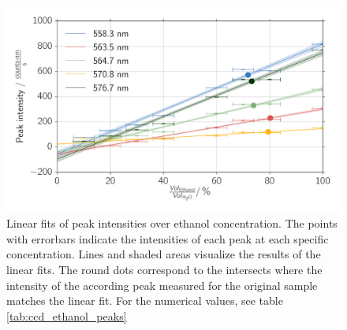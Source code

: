 \begin{figure}[htpb]
    \centering
    \includegraphics[width=0.8\linewidth]{analysis/figures/ccd_ethanol_intensity}
    \caption{
        Linear fits of peak intensities over ethanol concentration. The points with errorbars 
        indicate the intensities of each peak at each specific concentration. Lines 
        and shaded areas visualize the results of the linear fits. The round dots 
        correspond to the intersects where the intensity of the according peak measured 
        for the original sample matches the linear fit. For the numerical values, see table 
        \ref{tab:ccd_ethanol_peaks}
        }
    \label{fig:ccd_ethanol_intensity}
\end{figure}


